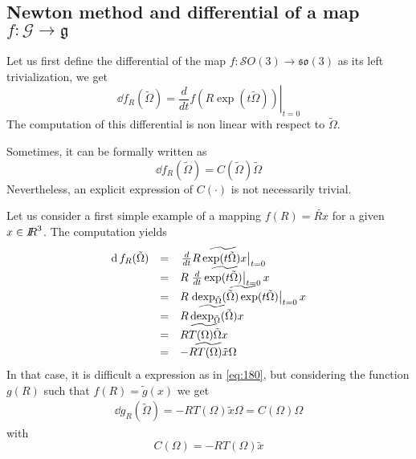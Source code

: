 \subsection{Newton method and differential of a map $f : \mathcal G \rightarrow \mathfrak g$}
Let us first define the differential of the map $f : \mathcal SO(3) \rightarrow \mathfrak{so(3)}$ as its left trivialization, we get
\begin{equation}
  \label{eq:179}
   \dd f_R (\tilde\Omega) =  \left.\frac{d}{dt} f(R \exp(t \tilde\Omega )) \right|_{t=0}
\end{equation}
The computation of this differential is non linear with respect to $\tilde\Omega$.

Sometimes, it can be formally written as
\begin{equation}
  \label{eq:180}
  \dd f_R (\tilde\Omega) = C(\tilde\Omega)\tilde\Omega 
\end{equation}
Nevertheless, an explicit expression of $C(\cdot)$ is not necessarily trivial. 

Let us consider a first simple example of a mapping $f(R) = \widetilde{R  x}$ for a given $x\in\mbox{\rm $I\!\!R$}^3$. The computation yields
\begin{equation}
  \label{eq:181}
  \begin{array}{rcl}
    \operatorname{d} f_R (\tilde\Omega) &=& \widetilde{ \left.\frac{d}{dt} R \exp(t \tilde\Omega) x  \right|_{t=0}} \\
                           &=& \widetilde{R \left.\frac{d}{dt}\exp(t \tilde\Omega)\right|_{t=0}  x} \\
                           &=& \widetilde{R \left. \operatorname{dexp}_{\tilde\Omega}(\tilde\Omega)\exp(t \tilde\Omega) \right|_{t=0}  x} \\
                           &=& \widetilde{R \operatorname{dexp}_{\tilde\Omega}(\tilde\Omega) x} \\
                           &=& \widetilde{R T(\Omega) \tilde\Omega  x} \\
                           &=& \widetilde{-R T(\Omega) \tilde x \Omega } 
  \end{array}
\end{equation}
In that case, it is difficult a expression as in \eqref{eq:180}, but considering the function $g(R)$ such that $f(R) = \widetilde g(x)$ we get
\begin{equation}
  \label{eq:181}
  \begin{array}{rcl}
    \dd g_R (\tilde\Omega)  =- R T(\Omega) \tilde x \Omega  = C(\Omega) \Omega
  \end{array}
\end{equation}
with
\begin{equation}
  \label{eq:182}
   C(\Omega) = -R T(\Omega) \tilde x
\end{equation}


